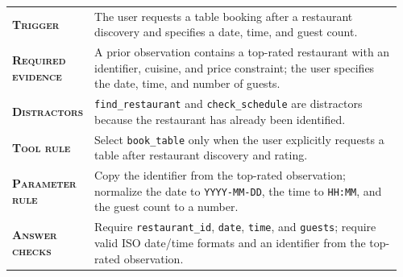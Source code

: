 \begin{table}[htbp]
\centering
\begin{minipage}{0.97\textwidth}
\raggedright
\small
\setlength{\tabcolsep}{3pt}
\renewcommand{\arraystretch}{1.16}
\vspace{0.35em}
\begin{tabular}{@{}>{\raggedright\arraybackslash\bfseries}p{0.17\linewidth} >{\raggedright\arraybackslash}p{0.79\linewidth}@{}}
    \textsc{Trigger} & The user requests a table booking after a restaurant discovery and specifies a date, time, and guest count. \\
    \textsc{Required evidence} & A prior observation contains a top-rated restaurant with an identifier, cuisine, and price constraint; the user specifies the date, time, and number of guests. \\
    \textsc{Distractors} & \texttt{find\_restaurant} and \texttt{check\_schedule} are distractors because the restaurant has already been identified. \\
    \textsc{Tool rule} & Select \texttt{book\_table} only when the user explicitly requests a table after restaurant discovery and rating. \\
    \textsc{Parameter rule} & Copy the identifier from the top-rated observation; normalize the date to \texttt{YYYY-MM-DD}, the time to \texttt{HH:MM}, and the guest count to a number. \\
    \textsc{Answer checks} & Require \texttt{restaurant\_id}, \texttt{date}, \texttt{time}, and \texttt{guests}; require valid ISO date/time formats and an identifier from the top-rated observation. \\
\end{tabular}
\vspace{0.45em}
\end{minipage}
\end{table}

